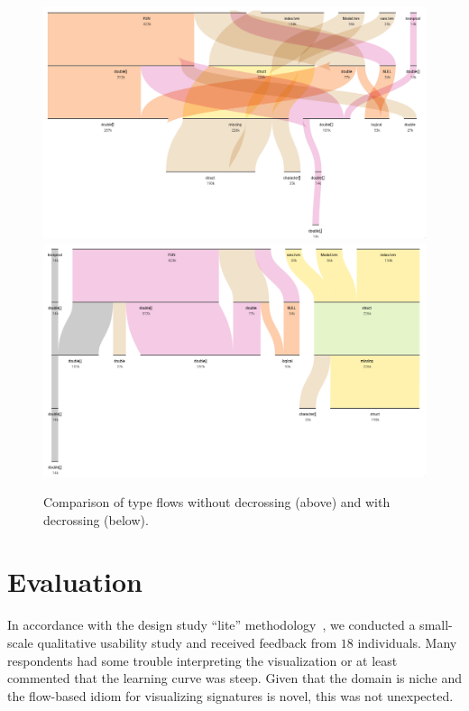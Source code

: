 \documentclass{vgtc}                          %
\begin{document}
\begin{figure}[tb]
 \centering
 \includegraphics[width=\columnwidth]{img/no_decross.png}
 \includegraphics[width=\columnwidth]{img/decross.png}
 \caption{Comparison of type flows without decrossing (above) and with decrossing (below).}
 \label{fig:decross}
\end{figure}


\section{Evaluation}

In accordance with the design study ``lite'' methodology~\cite{syeda:2020}, we conducted a small-scale qualitative usability study and received feedback from $18$ individuals. Many respondents had some trouble interpreting the visualization or at least commented that the learning curve was steep. Given that the domain is niche and the flow-based idiom for visualizing signatures is novel, this was not unexpected.
\end{document}
